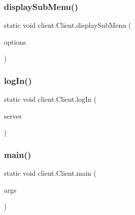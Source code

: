 \mbox{\label{classclient_1_1_client_a53ffa5e1dd33232694d89f2011acc973}} 
\subsubsection{\texorpdfstring{display\+Sub\+Menu()}{displaySubMenu()}}
{\footnotesize\ttfamily static void client.\+Client.\+display\+Sub\+Menu (\begin{DoxyParamCaption}\item[{String \mbox{[}$\,$\mbox{]}}]{options }\end{DoxyParamCaption})\hspace{0.3cm}{\ttfamily [static]}}

\mbox{\label{classclient_1_1_client_aa9400681614784a26489a925cbdddb0a}} 
\subsubsection{\texorpdfstring{log\+In()}{logIn()}}
{\footnotesize\ttfamily static void client.\+Client.\+log\+In (\begin{DoxyParamCaption}\item[{\hyperlink{interfaceserver_1_1remote_1_1_i_remote}{I\+Remote}}]{server }\end{DoxyParamCaption})\hspace{0.3cm}{\ttfamily [static]}}

\mbox{\label{classclient_1_1_client_a535f4e7494d7095589ebf11a8d8f50df}} 
\subsubsection{\texorpdfstring{main()}{main()}}
{\footnotesize\ttfamily static void client.\+Client.\+main (\begin{DoxyParamCaption}\item[{String \mbox{[}$\,$\mbox{]}}]{args }\end{DoxyParamCaption})\hspace{0.3cm}{\ttfamily [static]}}

